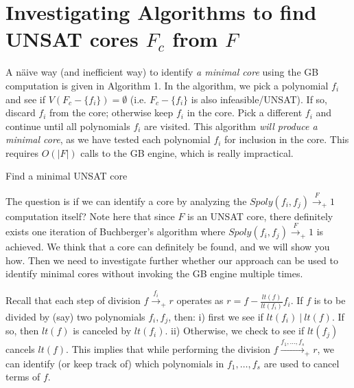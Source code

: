 \section{Investigating Algorithms to find UNSAT cores $F_c$ from $F$}

A n\"aive way (and inefficient way) to identify {\it a minimal core}
using the GB computation is given in Algorithm 1. In the algorithm, we
pick a polynomial $f_i$ and see if $V(F_c - \{f_i\}) = \emptyset$
(i.e. $F_c - \{f_i\}$ is also infeasible/UNSAT). If so, discard $f_i$
from the core; otherwise keep $f_i$ in the 
core. Pick a different $f_i$ and continue until all polynomials $f_i$
are visited. This algorithm {\it will produce a minimal core}, as we
have tested each polynomial $f_i$ for inclusion in the core. This
requires $O(|F|)$ calls to the GB engine, which is really impractical. 



\begin{algorithm}[hbt]
\caption{Find a minimal UNSAT core}\label{alg:MUS}
\label{alg1}
\begin{algorithmic}


   \ELSE 
   \ENDIF
 \ENDFOR
\end{algorithmic}
\end{algorithm}


The question is if we can identify a core by analyzing the
$Spoly(f_i,f_j)\xrightarrow{F}_+1$ computation itself? Note here
that since $F$ is an UNSAT core, there definitely exists one iteration
of Buchberger's algorithm where $Spoly(f_i, f_j) \xrightarrow{F}_+ 1$
is achieved. We think that a core can definitely be found, and we will
show you how. Then we need to investigate further whether our approach
can be used to identify minimal cores without invoking the GB engine
multiple times. 

Recall that each step of division $f \xrightarrow{f_i}_+r$ operates as
$r = f - \frac{lt(f)}{lt(f_i)} f_i$. If $f$ is to be divided by (say)
two polynomials $f_i, f_j$, then: i) first we see if $lt(f_i) ~|~
lt(f)$. If so, then $lt(f)$ is canceled by $lt(f_i)$. ii) Otherwise,
we check to see if $lt(f_j)$ cancels $lt(f)$. This implies that while
performing the division $f \xrightarrow{f_1, \dots, f_s}_+r$, we can
identify (or keep track of) which polynomials in $f_1, \dots, f_s$ are
used to cancel terms of $f$. 

